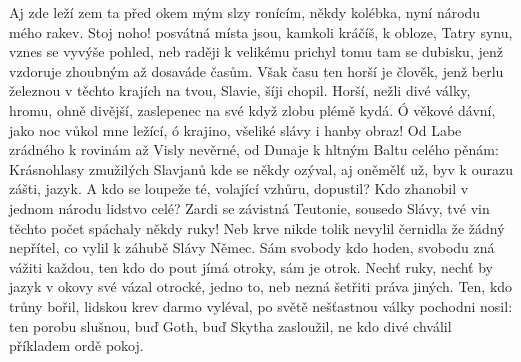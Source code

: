 Aj zde leží zem ta před okem mým slzy ronícím,
někdy kolébka, nyní národu mého rakev.
Stoj noho! posvátná místa jsou, kamkoli kráčíš,
k obloze, Tatry synu, vznes se vyvýše pohled,
neb raději k velikému prichyl tomu tam se dubisku,
jenž vzdoruje zhoubným až dosaváde časům.
Však času ten horší je člověk, jenž berlu železnou
v těchto krajích na tvou, Slavie, šíji chopil.
Horší, nežli divé války, hromu, ohně divější,
zaslepenec na své když zlobu plémě kydá.
Ó věkové dávní, jako noc vůkol mne ležící,
ó krajino, všeliké slávy i hanby obraz!
Od Labe zrádného k rovinám až Visly nevěrné,
od Dunaje k hltným Baltu celého pěnám:
Krásnohlasy zmužilých Slavjanů kde se někdy ozýval,
aj oněmělť už, byv k ourazu zášti, jazyk.
A kdo se loupeže té, volající vzhůru, dopustil?
Kdo zhanobil v jednom národu lidstvo celé?
Zardi se závistná Teutonie, sousedo Slávy,
tvé vin těchto počet spáchaly někdy ruky!
Neb krve nikde tolik nevylil černidla že žádný
nepřítel, co vylil k záhubě Slávy Němec.
Sám svobody kdo hoden, svobodu zná vážiti každou,
ten kdo do pout jímá otroky, sám je otrok.
Nechť ruky, nechť by jazyk v okovy své vázal otrocké,
jedno to, neb nezná šetřiti práva jiných.
Ten, kdo trůny bořil, lidskou krev darmo vyléval,
po světě nešťastnou války pochodni nosil:
ten porobu slušnou, buď Goth, buď Skytha zasloužil,
ne kdo divé chválil příkladem ordě pokoj.
